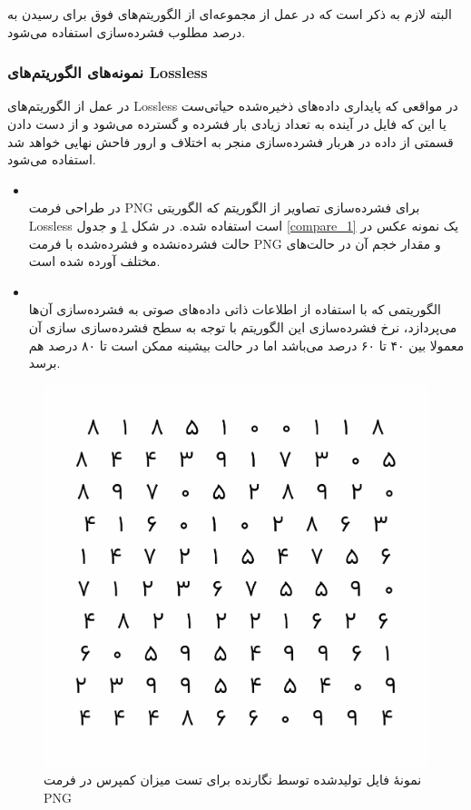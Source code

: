 البته لازم به ذکر است که در عمل از مجموعه‌ای از الگوریتم‌های فوق برای رسیدن به درصد مطلوب فشرده‌سازی استفاده می‌شود.

\subsubsection{نمونه‌های الگوریتم‌های Lossless}
در عمل از الگوریتم‌های Lossless در مواقعی که 
پایداری داده‌های ذخیره‌شده حیاتی‌ست یا این که فایل در آینده به تعداد زیادی بار فشرده و گسترده می‌شود و از دست دادن قسمتی از داده در
هربار فشرده‌سازی منجر به اختلاف و ارور فاحش نهایی خواهد شد استفاده می‌شود. 

\begin{itemize}
	\item {}\\
	در طراحی فرمت PNG برای فشرده‌سازی تصاویر از الگوریتم
	که الگوریتی Lossless است استفاده شده. 
	در 
	شکل 	\ref{example_1} و 
	جدول 	\ref{compare_1} 
	یک نمونه عکس در حالت فشرده‌نشده و فشرده‌شده با فرمت PNG
	و مقدار خجم آن در حالت‌های مختلف آورده شده است.

	\item {}\\
	الگوریتمی که با استفاده از اطلاعات ذاتی داده‌های صوتی به فشرده‌سازی آن‌ها می‌پردازد، نرخ فشرده‌سازی این الگوریتم با توجه به 
	سطح فشرده‌سازی سازی آن معمولا بین ۴۰ تا ۶۰ درصد می‌باشد اما در حالت بیشینه ممکن است تا ۸۰ درصد هم برسد.
	
\end{itemize}

\begin{figure}
	\centering
	\includegraphics[scale=0.6]{figs/compressed.png}
	\caption{نمونهٔ فایل تولیدشده توسط نگارنده برای تست میزان کمپرس در فرمت PNG}
	\label{example_1}
\end{figure}

